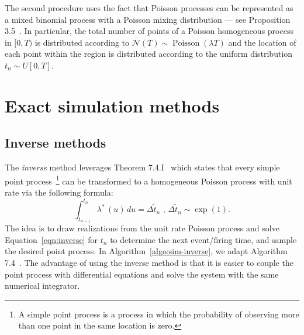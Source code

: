 \documentclass{juliacon}
\begin{document}
The second procedure uses the fact that Poisson processes can be represented as a mixed binomial process with a Poisson mixing distribution --- see Proposition 3.5~\cite{last2017}. In particular, the total number of points of a Poisson homogeneous process in \( [0, T) \) is distributed according to \( \mathcal{N} (T) \sim \operatorname{Poisson}( \lambda T ) \) and the location of each point within the region is distributed according to the uniform distribution \( t_n \sim U[0, T] \).




\section{Exact simulation methods} \label{sec:method-exact}

\subsection{Inverse methods} \label{subsec:sim-inverse}

The \textit{inverse} method leverages Theorem 7.4.I~\cite{daley2003} which states that every simple point process~\footnote{A simple point process is a process in which the probability of observing more than one point in the same location is zero.} can be transformed to a homogeneous Poisson process with unit rate via the following formula:
\begin{equation} \label{eqn:inverse}
  \int_{t_{n-1}}^{t_n} \lambda^\ast \, (u) \, du = \Delta \tilde{t}_n \text{ , } \Delta \tilde{t}_n \sim \exp(1).
\end{equation}
The idea is to draw realizations from the unit rate Poisson process and solve Equation~\ref{eqn:inverse} for $t_n$ to determine the next event/firing time, and sample the desired point process. In Algorithm~\ref{algo:sim-inverse}, we adapt Algorithm 7.4~\cite{daley2003}. The advantage of using the inverse method is that it is easier to couple the point process with differential equations and solve the system with the same numerical integrator.
\end{document}
